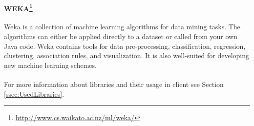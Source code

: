 
\paragraph{WEKA\footnote{\url{http://www.cs.waikato.ac.nz/ml/weka/}}}
Weka is a collection of machine learning algorithms for data mining tasks.
The algorithms can either be applied directly to a dataset or called from your
own Java code. Weka contains tools for data pre-processing, classification,
regression, clustering, association rules, and visualization. It is also
well-suited for developing new machine learning schemes.

\paragraph{} For more information about libraries and their usage in client see
Section \ref{ssec:UsedLibraries}.
